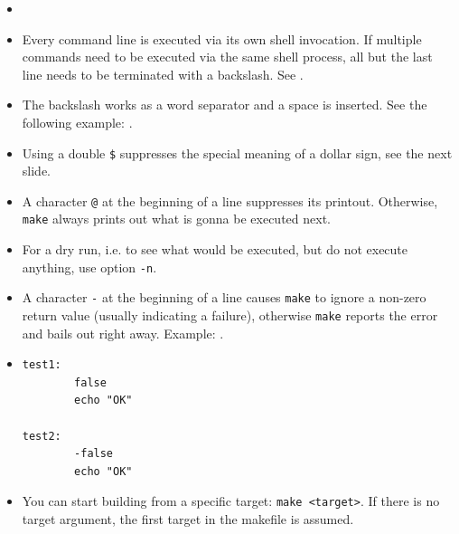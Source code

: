 \begin{itemize}
\item {}
\item Every command line is executed via its own shell invocation.  If
multiple commands need to be executed via the same shell process, all but the
last line needs to be terminated with a backslash.
See .
\item The backslash works as a word separator and a space is inserted.  See
the following example: .
\item Using a double \texttt{\$} suppresses the special meaning of a dollar
sign, see the next slide.
\item A character \texttt{@} at the beginning of a line suppresses its printout.
Otherwise, \texttt{make} always prints out what is gonna be executed next.
\item For a dry run, i.e. to see what would be executed, but do not execute
anything, use option \texttt{-n}.
\item A character \texttt{-} at the beginning of a line causes \texttt{make} to
ignore a non-zero return value (usually indicating a failure), otherwise
\texttt{make} reports the error and bails out right away.  Example:
.
\item
\begin{verbatim}
test1:
        false
        echo "OK"

test2:
        -false
        echo "OK"
\end{verbatim}
\item You can start building from a specific target: \texttt{make <target>}.  If
there is no target argument, the first target in the makefile is assumed.
\end{itemize}


